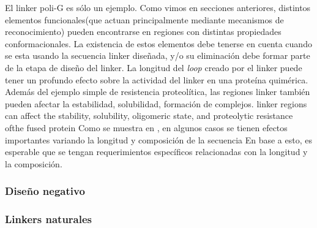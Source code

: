 El linker poli-G es sólo un ejemplo. 
Como vimos en secciones anteriores, distintos elementos funcionales(que actuan principalmente mediante mecanismos de reconocimiento) pueden encontrarse en regiones con distintas propiedades conformacionales. 
La existencia de estos elementos debe tenerse en cuenta cuando se esta usando la secuencia linker diseñada, y/o su eliminación debe formar parte de la etapa de diseño del linker.
La longitud del \textit{loop} creado por el linker puede tener un profundo efecto sobre la actividad del linker en una proteína quimérica\cite{nagi1997inverse}.
Además del ejemplo simple de resistencia proteolítica, las regiones linker también pueden afectar la estabilidad, solubilidad, formación de complejos.
linker regions can affect the stability, solubility, oligomeric state, and proteolytic resistance ofthe fused protein
Como se muestra en \cite{robinson1998optimizing}, en algunos casos se tienen efectos importantes variando la longitud y composición de la secuencia
En base a esto, es esperable que se tengan requerimientos específicos relacionadas con la longitud y la composición. 

\subsubsection{Diseño negativo}
\subsubsection{Linkers naturales}

